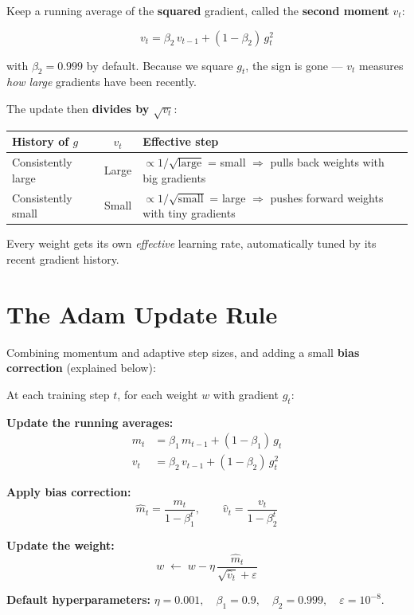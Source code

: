 \documentclass[12pt, a4paper]{article}
\theoremstyle{definition}
\begin{document}
Keep a running average of the \textbf{squared} gradient, called the
\textbf{second moment} $v_t$:

\[
  v_t = \beta_2 \, v_{t-1} + (1 - \beta_2)\, g_t^2
\]

with $\beta_2 = 0.999$ by default.
Because we square $g_t$, the sign is gone --- $v_t$ measures
\emph{how large} gradients have been recently.

The update then \textbf{divides by $\sqrt{v_t}$}:

\begin{center}
\renewcommand{\arraystretch}{1.3}
\begin{tabular}{lcp{6cm}}
\toprule
History of $g$ & $v_t$ & Effective step \\
\midrule
Consistently large & Large & $\propto 1/\sqrt{\text{large}}$ = small
  $\Rightarrow$ pulls back weights with big gradients \\
Consistently small & Small & $\propto 1/\sqrt{\text{small}}$ = large
  $\Rightarrow$ pushes forward weights with tiny gradients \\
\bottomrule
\end{tabular}
\end{center}

Every weight gets its own \emph{effective} learning rate, automatically tuned
by its recent gradient history.

\section{The Adam Update Rule}

Combining momentum and adaptive step sizes, and adding a small
\textbf{bias correction} (explained below):

\begin{adambox}
At each training step $t$, for each weight $w$ with gradient $g_t$:

\vspace{0.5em}
\textbf{Update the running averages:}
\begin{align*}
  m_t &= \beta_1 \, m_{t-1} + (1-\beta_1)\, g_t \\
  v_t &= \beta_2 \, v_{t-1} + (1-\beta_2)\, g_t^2
\end{align*}

\textbf{Apply bias correction:}
\[
  \hat{m}_t = \frac{m_t}{1 - \beta_1^t},
  \qquad
  \hat{v}_t = \frac{v_t}{1 - \beta_2^t}
\]

\textbf{Update the weight:}
\[
  w \;\longleftarrow\; w - \eta \,\frac{\hat{m}_t}{\sqrt{\hat{v}_t} + \varepsilon}
\]

\textbf{Default hyperparameters:}
$\eta = 0.001,\quad \beta_1 = 0.9,\quad \beta_2 = 0.999,\quad
\varepsilon = 10^{-8}$.
\end{adambox}
\end{document}
